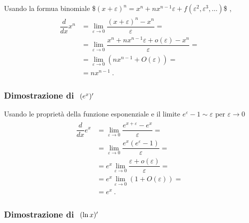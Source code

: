 \documentclass[letterpaper,10pt,english]{jupyterBook}
\begin{document}
\sphinxAtStartPar
Usando la formua binomiale \$\((x + \varepsilon)^n = x^n + n x^{n-1} \varepsilon + f(\varepsilon^2, \varepsilon^3, \dots)\)\$  ,
\begin{equation*}
\begin{split}\begin{aligned}
  \dfrac{d}{dx} x^n
  & = \lim_{\varepsilon \rightarrow 0}  \dfrac{(x+\varepsilon)^{n} - x^n}{\varepsilon} = \\
  & = \lim_{\varepsilon \rightarrow 0}  \dfrac{x^n + n x^{n-1} \varepsilon + o(\varepsilon) - x^n}{\varepsilon} = \\
  & = \lim_{\varepsilon \rightarrow 0}  \left( n x^{n-1} + O(\varepsilon) \right) = \\
  & = n x^{n-1} \ .
\end{aligned}\end{split}
\end{equation*}\subsubsection*{Dimostrazione di \protect\(\ (e^x)'\protect\)}

\sphinxAtStartPar
Usando le proprietà della funzione esponenziale e il limite \(e^{\varepsilon} - 1 \sim \varepsilon\) per \(\varepsilon \rightarrow 0\)
\begin{equation*}
\begin{split}\begin{aligned}
  \dfrac{d}{dx} e^x       
  & = \lim_{\varepsilon \rightarrow 0}  \dfrac{e^{x+\varepsilon} - e^x}{\varepsilon} = \\
  & = \lim_{\varepsilon \rightarrow 0}  \dfrac{e^x \left( e^{\varepsilon} - 1 \right)}{\varepsilon} = \\
  & = e^x \lim_{\varepsilon \rightarrow 0}  \dfrac{\varepsilon + o(\varepsilon)}{\varepsilon} = \\
  & = e^x \lim_{\varepsilon \rightarrow 0}  \left( 1 + O(\varepsilon) \right) = \\
  & = e^x \ .
\end{aligned}\end{split}
\end{equation*}\subsubsection*{Dimostrazione di \protect\(\ (\ln x)'\protect\)}
\end{document}

